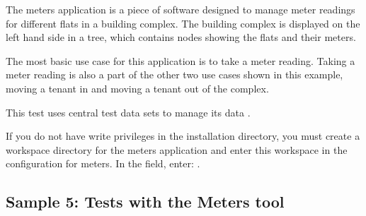 The meters application is a piece of software designed to manage meter readings for different flats in a building complex. The building complex is displayed on the left hand side in a tree, which contains nodes showing the flats and their meters. 

The most basic use case for this application is to take a meter reading. Taking a meter reading is also a part of the other two use cases shown in this example, moving a tenant in and moving a tenant out of the complex. 

This test uses central test data sets to manage its data . 

If you do not have write privileges in the \app{} installation directory, you must create a workspace directory for the meters application and enter this workspace in the \gdaut{} configuration for meters. In the  field, enter: .



\subsection{Sample 5: Tests with the Meters tool}



